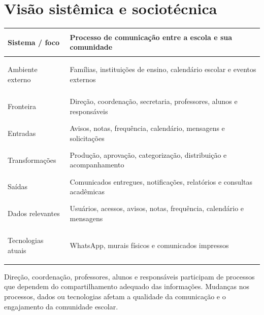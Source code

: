 \section{Visão sistêmica e sociotécnica}
\begin{table}[!ht]\centering\small\renewcommand{\arraystretch}{1.25}
\begin{tabularx}{\linewidth}{|>{\bfseries\raggedright\arraybackslash}p{4cm}|>{\raggedright\arraybackslash}X|}
\hline
Sistema / foco & Processo de comunicação entre a escola e sua comunidade \\
\hline
Ambiente externo & Famílias, instituições de ensino, calendário escolar e eventos externos \\
\hline
Fronteira & Direção, coordenação, secretaria, professores, alunos e responsáveis \\
\hline
Entradas & Avisos, notas, frequência, calendário, mensagens e solicitações \\
\hline
Transformações & Produção, aprovação, categorização, distribuição e acompanhamento \\
\hline
Saídas & Comunicados entregues, notificações, relatórios e consultas acadêmicas \\
\hline
Dados relevantes & Usuários, acessos, avisos, notas, frequência, calendário e mensagens \\
\hline
Tecnologias atuais & WhatsApp, murais físicos e comunicados impressos \\
\hline
\end{tabularx}
\end{table}

Direção, coordenação, professores, alunos e responsáveis participam de processos que dependem do compartilhamento adequado das informações. Mudanças nos processos, dados ou tecnologias afetam a qualidade da comunicação e o engajamento da comunidade escolar.
